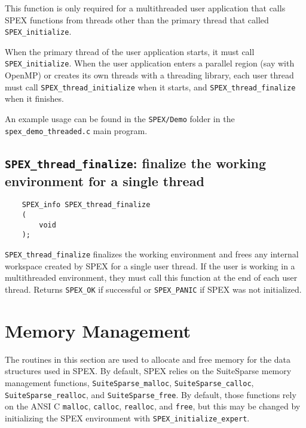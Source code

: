 \documentclass[12pt,oneside]{book}
\theoremstyle{definition}
\begin{document}
This function is only required for a multithreaded user application that
calls SPEX functions from threads other than the primary thread that
called \verb'SPEX_initialize'.

When the primary thread of the user application starts, it must call
\verb'SPEX_initialize'.  When the user application enters a parallel
region (say with OpenMP) or creates its own threads with a threading library,
each user thread must call \verb'SPEX_thread_initialize' when it starts,
and \verb'SPEX_thread_finalize' when it finishes.

An example usage can be found in the \verb'SPEX/Demo' folder in the
\verb'spex_demo_threaded.c' main program.

\subsection{\texttt{SPEX\_thread\_finalize}: finalize the working environment for a single thread}

\begin{mdframed}[userdefinedwidth=\textwidth]
{\footnotesize
\begin{verbatim}
    SPEX_info SPEX_thread_finalize
    ( 
        void 
    );
\end{verbatim}
} \end{mdframed}

\verb|SPEX_thread_finalize| finalizes the working environment and frees any 
internal workspace created by SPEX for a single user thread. If the user is working
in a multithreaded environment, they must call this function at the end of each
user thread. Returns \verb|SPEX_OK| if successful or \verb|SPEX_PANIC| if SPEX was not 
initialized.


\section{Memory Management} \label{s:user:memmanag}
The routines in this section are used to allocate and free memory for the data
structures used in SPEX.  By default, SPEX relies on the SuiteSparse
memory management functions, \verb|SuiteSparse_malloc|,
\verb|SuiteSparse_calloc|, \verb|SuiteSparse_realloc|, and
\verb|SuiteSparse_free|.  By default, those functions rely on the ANSI C
\verb|malloc|, \verb|calloc|, \verb|realloc|, and \verb|free|, but this may be
changed by initializing the SPEX environment with
\verb|SPEX_initialize_expert|.
\end{document}
